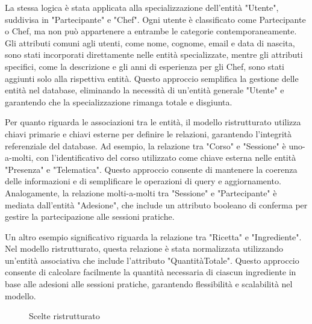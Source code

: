 La stessa logica è stata applicata alla specializzazione dell'entità "Utente", suddivisa in "Partecipante" e "Chef". Ogni utente è classificato come Partecipante o Chef, ma non può appartenere a entrambe le categorie contemporaneamente. Gli attributi comuni agli utenti, come nome, cognome, email e data di nascita, sono stati incorporati direttamente nelle entità specializzate, mentre gli attributi specifici, come la descrizione e gli anni di esperienza per gli Chef, sono stati aggiunti solo alla rispettiva entità. Questo approccio semplifica la gestione delle entità nel database, eliminando la necessità di un'entità generale "Utente" e garantendo che la specializzazione rimanga totale e disgiunta.

Per quanto riguarda le associazioni tra le entità, il modello ristrutturato utilizza chiavi primarie e chiavi esterne per definire le relazioni, garantendo l'integrità referenziale del database. Ad esempio, la relazione tra "Corso" e "Sessione" è uno-a-molti, con l'identificativo del corso utilizzato come chiave esterna nelle entità "Presenza" e "Telematica". Questo approccio consente di mantenere la coerenza delle informazioni e di semplificare le operazioni di query e aggiornamento. Analogamente, la relazione molti-a-molti tra "Sessione" e "Partecipante" è mediata dall'entità "Adesione", che include un attributo booleano di conferma per gestire la partecipazione alle sessioni pratiche.

Un altro esempio significativo riguarda la relazione tra "Ricetta" e "Ingrediente". Nel modello ristrutturato, questa relazione è stata normalizzata utilizzando un'entità associativa che include l'attributo "QuantitàTotale". Questo approccio consente di calcolare facilmente la quantità necessaria di ciascun ingrediente in base alle adesioni alle sessioni pratiche, garantendo flessibilità e scalabilità nel modello.
\begin{figure}[H]
    \noindent{}
    \caption{Scelte ristrutturato}
\end{figure}

